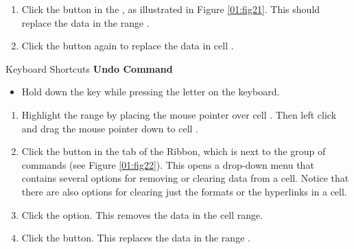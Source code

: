 \begin{enumerate}
	\item Click the  button in the , as illustrated in Figure \ref{01:fig21}. This should replace the data in the range .
	\item Click the  button again to replace the data in cell .
\end{enumerate}

\begin{center}
	\begin{shtcutbox}{Keyboard Shortcuts}
		\textbf{Undo Command}
		\\
		\begin{itemize}
			\setlength{\itemsep}{0pt}
			\setlength{\parskip}{0pt}
			\setlength{\parsep}{0pt}
			
			\item Hold down the  key while pressing the letter  on the keyboard.
			
		\end{itemize}
	\end{shtcutbox}
\end{center}

\begin{enumerate}[resume]
	\item Highlight the range  by placing the mouse pointer over cell . Then left click and drag the mouse pointer down to cell .
	\item Click the  button in the  tab of the Ribbon, which is next to the  group of commands (see Figure \ref{01:fig22}). This opens a drop-down menu that contains several options for removing or clearing data from a cell. Notice that there are also options for clearing just the formats or the hyperlinks in a cell.
	\item Click the  option. This removes the data in the cell range.
	\item Click the  button. This replaces the data in the range .
\end{enumerate}

